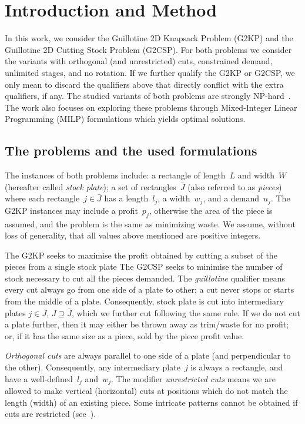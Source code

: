 \documentclass[9pt]{entcs}
\begin{document}
\section{Introduction and Method}\label{intro}

In this work, we consider the Guillotine 2D Knapsack Problem (G2KP) and the Guillotine 2D Cutting Stock Problem (G2CSP).
For both problems we consider the variants with orthogonal (and unrestricted) cuts, constrained demand, unlimited stages, and no rotation.
If we further qualify the G2KP or G2CSP, we only mean to discard the qualifiers above that directly conflict with the extra qualifiers, if any.
The studied variants of both problems are strongly NP-hard~\cite{martello:1998,russo:2020}.
The work also focuses on exploring these problems through Mixed-Integer Linear Programming (MILP) formulations which yields optimal solutions.

\subsection{The problems and the used formulations}

The instances of both problems include: a rectangle of length~\(L\) and width~\(W\) (hereafter called \emph{stock plate}); a set of rectangles~\(\bar{J}\) (also referred to as \emph{pieces}) where each rectangle~\(j \in \bar{J}\) has a length~\(l_j\), a width~\(w_j\), and a demand~\(u_j\).
The G2KP instances may include a profit~\(p_j\), otherwise the area of the piece is assumed, and the problem is the same as minimizing waste.
We assume, without loss of generality, that all values above mentioned are positive integers.

The G2KP seeks to maximise the profit obtained by cutting a subset of the pieces from a single stock plate
The G2CSP seeks to minimise the number of stock necessary to cut all the pieces demanded.
The \emph{guillotine} qualifier means every cut always go from one side of a plate to other; a cut never stops or starts from the middle of a plate. %
Consequently, stock plate is cut into intermediary plates \(j \in J\), \(J \supseteq \bar{J}\), which we further cut following the same rule.
If we do not cut a plate further, then it may either be thrown away as trim/waste for no profit; or, if it has the same size as a piece, sold by the piece profit value.

\emph{Orthogonal cuts} are always parallel to one side of a plate (and perpendicular to the other).
Consequently, any intermediary plate~\(j\) is always a rectangle, and have a well-defined~\(l_j\) and~\(w_j\).
The modifier \emph{unrestricted cuts} means we are allowed to make vertical (horizontal) cuts at positions which do not match the length (width) of an existing piece.
Some intricate patterns cannot be obtained if cuts are restricted (see~\cite{puchinger:2007}).
\end{document}
